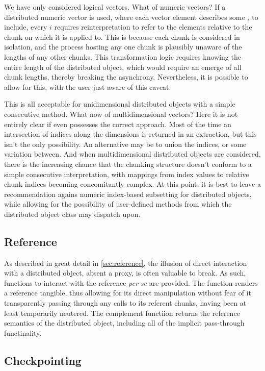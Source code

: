 We have only considered logical vectors.
What of numeric vectors?
If a distributed numeric vector is used, where each vector element describes some $_i$ to include, every $i$ requires reinterpretation to refer to the elements relative to the chunk on which it is applied to.
This is because each chunk is considered in isolation, and the process hosting any one chunk is plausibly unaware of the lengths of any other chunks.
This transformation logic requires knowing the entire length of the distributed object, which would require an emerge of all chunk lengths, thereby breaking the asynchrony.
Nevertheless, it is possible to allow for this, with the user just aware of this caveat.

This is all acceptable for unidimensional distributed objects with a simple consecutive  method.
What now of multidimensional vectors?
Here it is not entirely clear if \R even possesses the correct approach.
Most of the time an intersection of indices along the dimensions is returned in an extraction, but this isn't the only possibility.
An alternative may be to union the indices, or some variation between.
And when multidimensional distributed objects are considered, there is the increasing chance that the chunking structure doesn't conform to a simple consecutive interpretation, with mappings from index values to relative chunk indices becoming concomitantly complex.
At this point, it is best to leave a recommendation agains numeric index-based subsetting for distributed objects, while allowing for the possibility of user-defined methods from which the distributed object class may dispatch upon.

\subsection{Reference}

As described in great detail in \cref{sec:reference}, the illusion of direct interaction with a distributed object, absent a proxy, is often valuable to break.
As such, functions to interact with the reference \textit{per se} are provided.
The  function renders a reference tangible, thus allowing for its direct manipulation without fear of it transparently passing through any calls to its referent chunks, having been at least temporarily neutered.
The complement functiion  returns the reference semantics of the distributed object, including all of the implicit pass-through functinality.

\subsection{Checkpointing}

